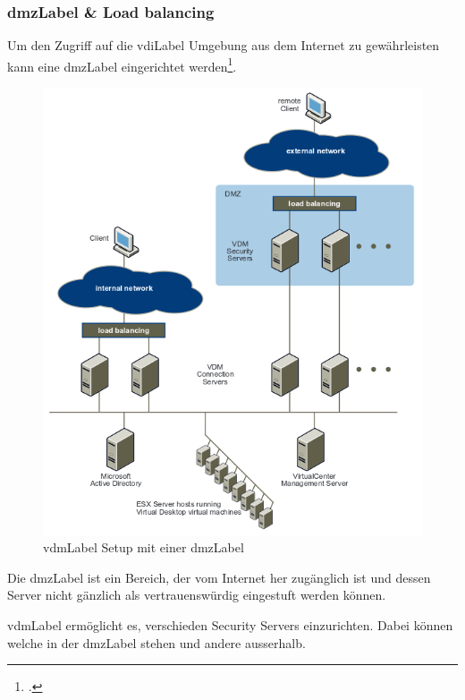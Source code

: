 \begin{minipage}{\textwidth}
\subsubsection{\Gls{dmzLabel} \& Load balancing}
Um den Zugriff auf die \Gls{vdiLabel} Umgebung aus dem Internet zu gewährleisten kann eine \Gls{dmzLabel} eingerichtet werden\footcite{Introduction_to_Virtual_Desktop_Manager}.

\begin{figure}[H]
	\includegraphics[width=\textwidth]{images/vmware-vdm-dmz2}
	\caption{\Gls{vdmLabel} Setup mit einer \Gls{dmzLabel}}
	\label{fig:vdmSetupDmz}
\end{figure}
\end{minipage}

Die \Gls{dmzLabel} ist ein Bereich, der vom Internet her zugänglich ist und dessen Server nicht gänzlich als vertrauenswürdig eingestuft werden können.

\Gls{vdmLabel} ermöglicht es, verschieden Security Servers einzurichten. Dabei können welche in der \Gls{dmzLabel} stehen und andere ausserhalb.

